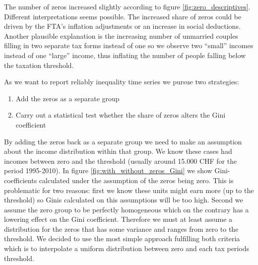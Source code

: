 \documentclass[twoside]{article}\usepackage[]{graphicx}\usepackage[]{color}
\newenvironment{knitrout}{}{} %
\begin{document}
\begin{multicols}{2}
\begin{knitrout}
\end{knitrout}

The number of zeros increased slightly according to figure \ref{fig:zero_descriptives}. Different interpretations seems possible. The increased share of zeros could be driven by the FTA's inflation adjustments or an increase in social deductions. Another plausible explanation is the increasing number of unmarried couples filling in two separate tax forms instead of one so we observe two ``small'' incomes instead of one ``large'' income, thus inflating the number of people falling below the taxation threshold. 


As we want to report reliably inequality time series we pursue two strategies:

\begin{enumerate}
\item Add the zeros as a separate group
\item Carry out a statistical test whether the share of zeros alters the Gini coefficient
\end{enumerate}

By adding the zeros back as a separate group we need to make an assumption about the income distribution within that group. We know these cases had incomes between zero and the threshold (usually around 15.000 CHF for the period 1995-2010). In figure \ref{fig:with_without_zeros_Gini} we show Gini-coefficients calculated under the assumption of the zeros being zero. This is problematic for two reasons: first we know these units might earn more (up to the threshold) so Ginis calculated on this assumptions will be too high. Second we assume the zero group to be perfectly homogeneous which on the contrary has a lowering effect on the Gini coefficient. Therefore we must at least assume a distribution for the zeros that has some variance and ranges from zero to the threshold. We decided to use the most simple approach fulfilling both criteria which is to interpolate a uniform distribution between zero and each tax periods threshold.


\end{multicols}
\end{document}
